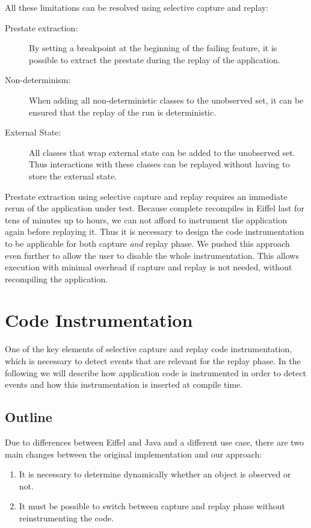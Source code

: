 All these limitations can be resolved using selective capture and replay:
\begin{description}
\item [Prestate extraction:] By setting a breakpoint at the beginning of the failing feature, it is possible to extract the prestate during the replay of the application.
\item [Non-determinism:] When adding all non-deterministic classes to the unobserved set, it can be ensured that the replay of the run is deterministic.
\item [External State:] All classes that wrap external state can be added to the unobserved set. Thus interactions with these classes can be replayed without having to store the external state.
\end{description}

Prestate extraction using selective capture and replay requires an immediate rerun of the application under test. Because complete recompiles in Eiffel last for tens of minutes up to hours, we can not afford to instrument the application again before replaying it. Thus it is necessary to design the code instrumentation to be applicable for both capture \emph{and} replay phase. We pushed this approach even further to allow the user to disable the whole instrumentation. This allows execution with minimal overhead if capture and replay is not needed, without recompiling the application.

\section{Code Instrumentation}
One of the key elements of selective capture and replay code instrumentation, which is necessary to detect events that are relevant for the replay phase. In the following we will describe how application code is instrumented in order to detect events and how this instrumentation is inserted at compile time.

\subsection{Outline}
Due to differences between Eiffel and Java and a different use case, there are two main changes between the original implementation and our approach:

\begin{enumerate}
 \item It is necessary to determine dynamically whether an object is observed or not.
\item It must be possible to switch between capture and replay phase without reinstrumenting the code.
\end{enumerate}

